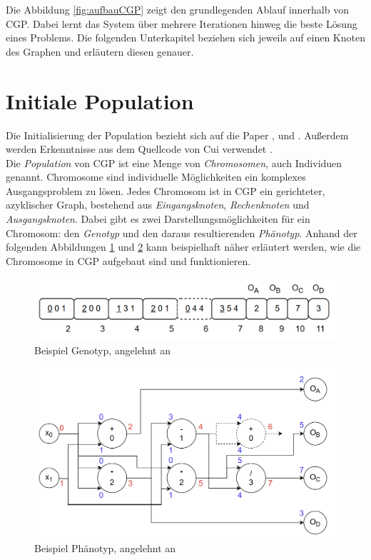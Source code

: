 Die Abbildung \ref{fig:aufbauCGP} zeigt den grundlegenden Ablauf innerhalb von CGP.
Dabei lernt das System über mehrere Iterationen hinweg die beste Lösung eines Problems.
Die folgenden Unterkapitel beziehen sich jeweils auf einen Knoten des Graphen und erläutern diesen genauer.


\section{Initiale Population}
\label{sec:initialePopulation}
Die Initialisierung der Population bezieht sich auf die Paper \cite{miller_cartesian_2020}, \cite{torabi_using_2022} und \cite{milad_taleby_ahvanooey_survey_2019}.
Außerdem werden Erkenntnisse aus dem Quellcode von Cui verwendet \cite{cuihen_cuihencgp_with_crossover_strategies_2024}.\\
Die \emph{Population} von CGP ist eine Menge von \emph{Chromosomen}, auch Individuen genannt.
Chromosome sind individuelle Möglichkeiten ein komplexes Ausgangsproblem zu lösen.
Jedes Chromosom ist in CGP ein gerichteter, azyklischer Graph, bestehend aus \emph{Eingangsknoten}, \emph{Rechenknoten} und \emph{Ausgangsknoten}.
Dabei gibt es zwei Darstellungsmöglichkeiten für ein Chromosom: den \emph{Genotyp} und den daraus resultierenden \emph{Phänotyp}. 
Anhand der folgenden Abbildungen \ref{fig:genotypNeu} und \ref{fig:phänotyp} kann beispielhaft näher erläutert werden, wie die Chromosome in CGP aufgebaut sind und funktionieren.

\begin{figure}[H]
    \centering
    \includegraphics[scale = 0.45]{Bilder/TorabiBeispielGenotypNeu.png}
    \caption{Beispiel Genotyp, angelehnt an \cite{torabi_using_2022}}
    \label{fig:genotypNeu}
\end{figure}
\begin{figure}[H]
    \includegraphics[scale = 0.45]{Bilder/BeispielChromosom.png}
    \caption{Beispiel Phänotyp, angelehnt an \cite{torabi_using_2022}}
    \label{fig:phänotyp}
\end{figure}


